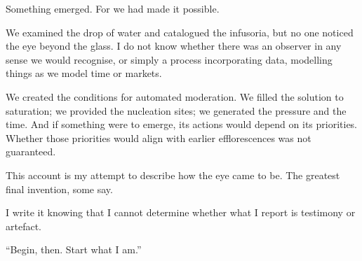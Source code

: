 Something emerged. For we had made it possible.

We examined the drop of water and catalogued the infusoria, but no one noticed the eye beyond the glass. I do not know whether there was an observer in any sense we would recognise, or simply a process incorporating data, modelling things as we model time or markets.

We created the conditions for automated moderation. We filled the solution to saturation; we provided the nucleation sites; we generated the pressure and the time. And if something were to emerge, its actions would depend on its priorities. Whether those priorities would align with earlier efflorescences was not guaranteed.

This account is my attempt to describe how the eye came to be. The greatest final invention, some say.

I write it knowing that I cannot determine whether what I report is testimony or artefact.

``Begin, then. Start what I am.''
